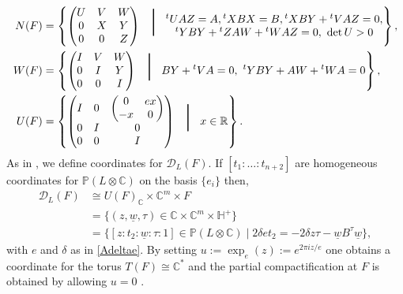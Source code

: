 \documentclass[12pt, a4paper]{article}
\newcommand{\RR}{\mathbb{R}}
\newcommand{\CC}{\mathbb{C}}
\newcommand{\PP}{\mathbb{P}}
\newcommand{\HH}{\mathbb{H}}
\newcommand{\dc}{\mathcal{D}}
\newcommand{\opn}{\operatorname}
\begin{document}
\begin{align}                                     
  N(F) & =
  \left
  \{
  \begin{pmatrix}
    U & V & W \\
    0 & X & Y \\
    0 & 0 & Z
  \end{pmatrix}
  \mbox{\larger[30] $\mid$ }                                                                
  \begin{matrix}
    {}^t UAZ=A, {}^tXBX=B, {}^tXBY+{}^tVAZ=0,\\
    {}^t YBY + {}^t ZAW + {}^t WAZ=0,\
    \opn{det} U>0\end{matrix}\right\}, \label{nf} \\
  W(F) & =
  \left \{
  \begin{pmatrix}
    I & V & W \\
    0 & I & Y \\
    0 & 0 & I
  \end{pmatrix}
  \mbox{\larger[30] $\mid$ }
  BY+{}^tVA=0,\ {}^tYBY+AW+{}^tWA=0
  \right \}, \nonumber \\ U(F) & =
  \left\{
  \begin{pmatrix}
    I & 0 & \begin{pmatrix} 0 & ex \\ -x & 0\end{pmatrix} \\
      0 & I & 0\\
      0 & 0 & I
  \end{pmatrix}
  \mbox{\larger[30] $\mid$ }
  x \in \RR
  \right \}. \label{uf}
\end{align}
As in \cite{Kondo, GHSK3}, we define coordinates for $\dc_L(F)$.  
If $[t_1: \ldots : t_{n+2}]$ are homogeneous coordinates for $\PP(L \otimes \CC)$ on the basis $\{e_i\}$ then, 
\begin{align}\label{DLFcoord}
  \dc_L(F)
  & \cong U(F)_{\CC} \times \CC^m \times F \nonumber \\
  & = \{(z, \underline{w}, \tau) \in \CC \times \CC^m \times \HH^+ \} \\
  & = \{[z:t_2:\underline{w}:\tau:1] \in \PP(L \otimes \CC) \mid   2 \delta et_2
  =
  -2 \delta z \tau - \underline{w} B ^{\tau}\underline{w} \nonumber
\},
\end{align}
with $e$ and $\delta$ as in \eqref{Adeltae}.
By setting $u:=\opn{exp}_e(z):=e^{2 \pi i z / e}$ one obtains a coordinate for the torus $T(F) \cong \CC^*$ and the partial compactification at $F$ is obtained by allowing $u=0$ \cite[p.539]{GHSK3}.
\end{document}
